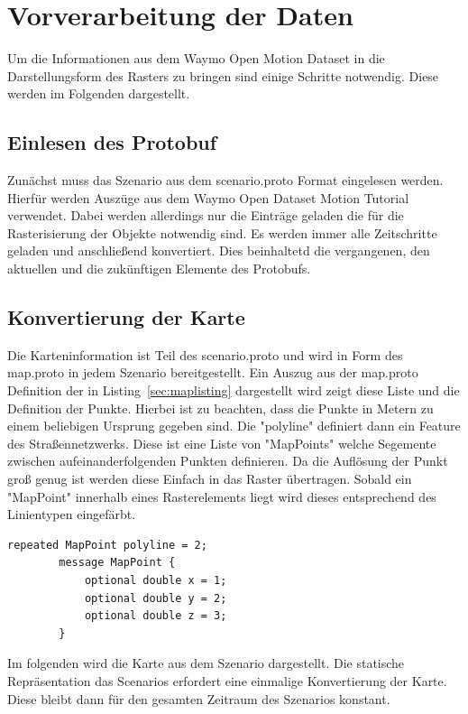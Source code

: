 \documentclass[12pt]{article}
\begin{document}
\section{Vorverarbeitung der Daten}
\label{sec:preprocessing}
    Um die Informationen aus dem Waymo Open Motion Dataset in die Darstellungsform des Rasters zu bringen 
    sind einige Schritte notwendig. Diese werden im Folgenden dargestellt. 
    \subsection{Einlesen des Protobuf} 
        Zunächst muss das Szenario aus dem scenario.proto Format eingelesen werden. 
        Hierfür werden Auszüge aus dem Waymo Open Dataset Motion Tutorial~\cite{Tutorial2021} verwendet. 
        Dabei werden allerdings nur die Einträge geladen die für die Rasterisierung der Objekte notwendig sind. 
        Es werden immer alle Zeitschritte geladen und anschließend konvertiert. 
        Dies beinhaltetd die vergangenen, den aktuellen und die zukünftigen Elemente des Protobufs.
    \subsection{Konvertierung der Karte}
        Die Karteninformation ist Teil des scenario.proto und wird in Form des map.proto in jedem Szenario bereitgestellt.
        Ein Auszug aus der map.proto Definition der in Listing~\ref{sec:maplisting} dargestellt wird zeigt diese Liste und die Definition der Punkte. 
        Hierbei ist zu beachten, dass die Punkte in Metern zu einem beliebigen Ursprung gegeben sind. 
        Die "polyline" definiert dann ein Feature des Straßennetzwerks. Diese ist eine Liste von "MapPoints" welche Segemente zwischen aufeinanderfolgenden Punkten definieren.
        Da die Auflösung der Punkt groß genug ist werden diese Einfach in das Raster übertragen. 
        Sobald ein "MapPoint" innerhalb eines Rasterelements liegt wird dieses entsprechend des Linientypen eingefärbt.
        \vspace{0.5cm}
        \begin{lstlisting}[language=protobuf2, caption=Auszug aus map.proto, label={sec:maplisting}]
        repeated MapPoint polyline = 2;
        message MapPoint {
            optional double x = 1;
            optional double y = 2;
            optional double z = 3;
        }
        \end{lstlisting}
        Im folgenden wird die Karte aus dem Szenario %
        dargestellt. Die statische Repräsentation das Scenarios erfordert eine einmalige Konvertierung der Karte. 
        Diese bleibt dann für den gesamten Zeitraum des Szenarios konstant.
\end{document}
